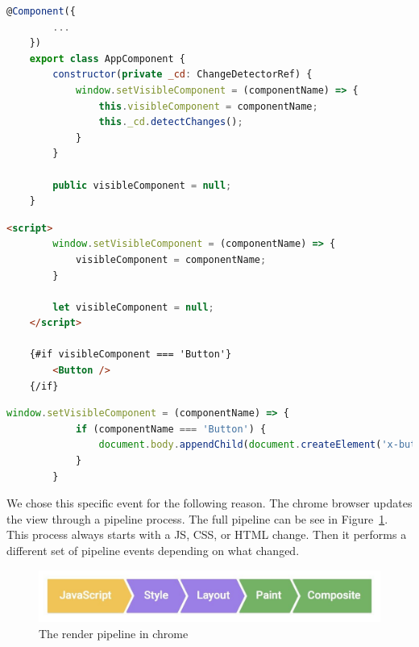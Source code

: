 \begin{lstlisting}[language={JavaScript},caption={The render-on-demand function in Angular (JavaScript file)},label={lst:experimental-setup:angular-set-visible-js}]
	@Component({
		...
	})
	export class AppComponent {
		constructor(private _cd: ChangeDetectorRef) {
			window.setVisibleComponent = (componentName) => {
				this.visibleComponent = componentName;
				this._cd.detectChanges();
			}
		}

		public visibleComponent = null;
	}
\end{lstlisting}

\begin{lstlisting}[language={HTML},caption={The render-on-demand function in Svelte},label={lst:experimental-setup:svelte-set-visible}]
	<script>
		window.setVisibleComponent = (componentName) => {
			visibleComponent = componentName;
		}

		let visibleComponent = null;
	</script>

	{#if visibleComponent === 'Button'}
		<Button />
	{/if}
\end{lstlisting}

\begin{lstlisting}[language={JavaScript}, caption={The render-on-demand function in Web Components},label={lst:experimental-setup:web-components-set-visible}]
		window.setVisibleComponent = (componentName) => {
			if (componentName === 'Button') {
				document.body.appendChild(document.createElement('x-button'));
			}
		}
\end{lstlisting}

We chose this specific event for the following reason. The chrome browser updates the view through a pipeline process. The full pipeline can be see in Figure~\ref{fig:experimental-setup:pipeline}. This process always starts with a JS, CSS, or HTML change. Then it performs a different set of pipeline events depending on what changed.

\begin{figure}[h]
	\includegraphics[width=\columnwidth]{figures/experimental-setup/render-pipeline.jpg}
	\caption{The render pipeline in chrome}
	\label{fig:experimental-setup:pipeline}
	\centering
\end{figure}

